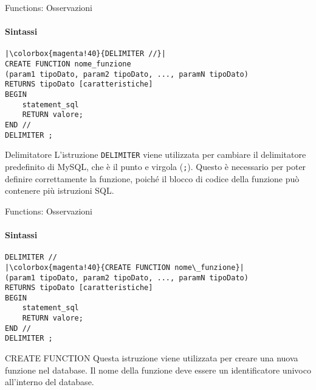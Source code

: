 \begin{frame}[fragile]{Functions: Osservazioni}
\framesubtitle{Sintassi}
\vspace{-.8cm}
\begin{lstlisting}
|\colorbox{magenta!40}{DELIMITER //}|
CREATE FUNCTION nome_funzione
(param1 tipoDato, param2 tipoDato, ..., paramN tipoDato)
RETURNS tipoDato [caratteristiche]
BEGIN
    statement_sql
    RETURN valore;
END //
DELIMITER ;
\end{lstlisting}
\begin{minipage}{\textwidth}
    \small \begin{block}{Delimitatore}
    L'istruzione \texttt{DELIMITER} viene utilizzata per cambiare il delimitatore predefinito di MySQL, che \`e il punto e virgola (\texttt{;}).
    Questo \`e necessario per poter definire correttamente la funzione, poich\'e il blocco di codice della funzione pu\`o contenere pi\`u istruzioni SQL.
    \end{block}
    \end{minipage}
\end{frame}
%
\begin{frame}[fragile]{Functions: Osservazioni}
\framesubtitle{Sintassi}
\vspace{-.6cm}
\begin{lstlisting}
DELIMITER //
|\colorbox{magenta!40}{CREATE FUNCTION nome\_funzione}|
(param1 tipoDato, param2 tipoDato, ..., paramN tipoDato)
RETURNS tipoDato [caratteristiche]
BEGIN
    statement_sql
    RETURN valore;
END //
DELIMITER ;
\end{lstlisting}
\begin{minipage}{\textwidth}
    \begin{block}{CREATE FUNCTION}
    Questa istruzione viene utilizzata per creare una nuova funzione nel database.
    Il nome della funzione deve essere un identificatore univoco all'interno del database.
    \end{block}
    \end{minipage}
\end{frame}
%
